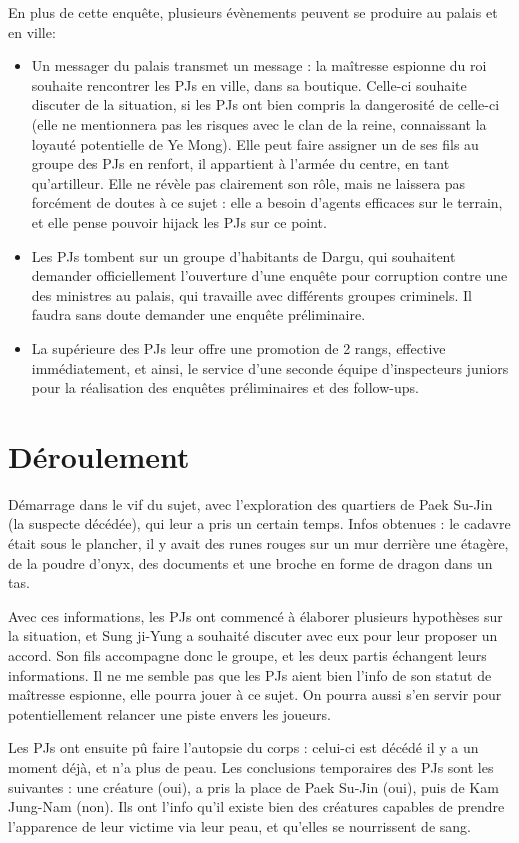 \documentclass[10pt,a4paper]{book}
\begin{document}
En plus de cette enquête, plusieurs évènements peuvent se produire au palais et en ville:
\begin{itemize}
\item Un messager du palais transmet un message : la maîtresse espionne du roi souhaite rencontrer les PJs en ville, dans sa boutique. Celle-ci souhaite discuter de la situation, si les PJs ont bien compris la dangerosité de celle-ci (elle ne mentionnera pas les risques avec le clan de la reine, connaissant la loyauté potentielle de Ye Mong). Elle peut faire assigner un de ses fils au groupe des PJs en renfort, il appartient à l'armée du centre, en tant qu'artilleur. Elle ne révèle pas clairement son rôle, mais ne laissera pas forcément de doutes à ce sujet : elle a besoin d'agents efficaces sur le terrain, et elle pense pouvoir hijack les PJs sur ce point.
\item Les PJs tombent sur un groupe d'habitants de Dargu, qui souhaitent demander officiellement l'ouverture d'une enquête pour corruption contre une des ministres au palais, qui travaille avec différents groupes criminels. Il faudra sans doute demander une enquête préliminaire.
\item La supérieure des PJs leur offre une promotion de 2 rangs, effective immédiatement, et ainsi, le service d'une seconde équipe d'inspecteurs juniors pour la réalisation des enquêtes préliminaires et des follow-ups.
\end{itemize}
\section{Déroulement}
Démarrage dans le vif du sujet, avec l'exploration des quartiers de Paek Su-Jin (la suspecte décédée), qui leur a pris un certain temps.
Infos obtenues : le cadavre était sous le plancher, il y avait des runes rouges sur un mur derrière une étagère, de la poudre d'onyx, des documents et une broche en forme de dragon dans un tas. 

Avec ces informations, les PJs ont commencé à élaborer plusieurs hypothèses sur la situation, et Sung ji-Yung a souhaité discuter avec eux pour leur proposer un accord. Son fils accompagne donc le groupe, et les deux partis échangent leurs informations. Il ne me semble pas que les PJs aient bien l'info de son statut de maîtresse espionne, elle pourra jouer à ce sujet. On pourra aussi s'en servir pour potentiellement relancer une piste envers les joueurs.

Les PJs ont ensuite pû faire l'autopsie du corps : celui-ci est décédé il y a un moment déjà, et n'a plus de peau. Les conclusions temporaires des PJs sont les suivantes : une créature (oui), a pris la place de Paek Su-Jin (oui), puis de Kam Jung-Nam (non). Ils ont l'info qu'il existe bien des créatures capables de prendre l'apparence de leur victime via leur peau, et qu'elles se nourrissent de sang.
\end{document}

